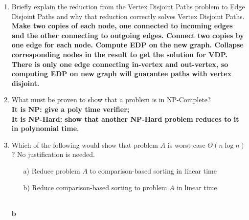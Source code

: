 \documentclass[10pt]{article}
\newcommand{\answer}[1]{\color{blue}\hfill\break\\\noindent\textbf{#1}\color{black}\hfill\break}
\begin{document}
\begin{enumerate}
        \item Briefly explain the reduction from the Vertex Disjoint Paths problem to Edge Disjoint Paths and why that reduction correctly solves Vertex Disjoint Paths.
            \answer{Make two copies of each node, one connected to incoming edges and the other connecting to outgoing edges. Connect two copies by one edge for each node. Compute EDP on the new graph. Collapse corresponding nodes in the result to get the solution for VDP. \\
            There is only one edge connecting in-vertex and out-vertex, so computing EDP on new graph will guarantee paths with vertex disjoint.} %

        \item What must be proven to show that a problem is in NP-Complete?
            \answer{It is NP: give a poly time verifier;\\
            It is NP-Hard: show that another NP-Hard problem reduces to it in polynomial time.} %

        \item Which of the following would show that problem $A$ is worst-case $\Theta(n \log n)$?  No justification is needed.
            \begin{itemize}
                \item[a) ] Reduce problem $A$ to comparison-based sorting in linear time
                \item[b) ] Reduce comparison-based sorting to problem $A$ in linear time
            \end{itemize}
            \answer{b} %

    \end{enumerate}
\end{document}
